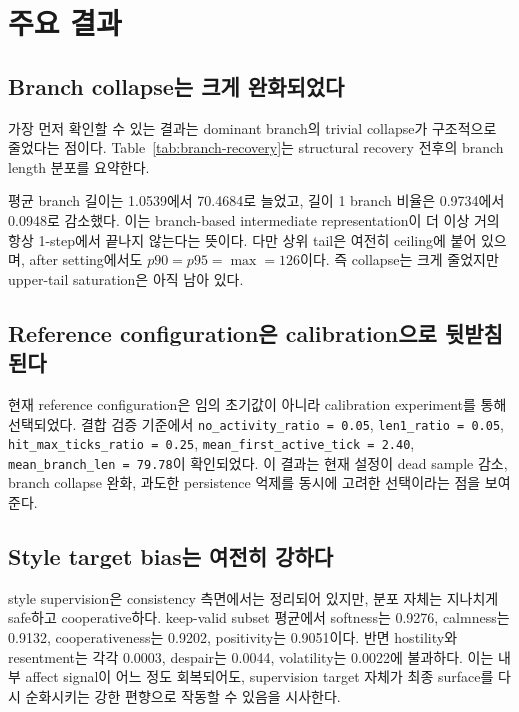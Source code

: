 \section{주요 결과}

\subsection{Branch collapse는 크게 완화되었다}

가장 먼저 확인할 수 있는 결과는 dominant branch의 trivial collapse가 구조적으로 줄었다는 점이다. Table~\ref{tab:branch-recovery}는 structural recovery 전후의 branch length 분포를 요약한다.



평균 branch 길이는 1.0539에서 70.4684로 늘었고, 길이 1 branch 비율은 0.9734에서 0.0948로 감소했다. 이는 branch-based intermediate representation이 더 이상 거의 항상 1-step에서 끝나지 않는다는 뜻이다. 다만 상위 tail은 여전히 ceiling에 붙어 있으며, after setting에서도 $p90 = p95 = \max = 126$이다. 즉 collapse는 크게 줄었지만 upper-tail saturation은 아직 남아 있다.

\subsection{Reference configuration은 calibration으로 뒷받침된다}

현재 reference configuration은 임의 초기값이 아니라 calibration experiment를 통해 선택되었다. 결합 검증 기준에서 \texttt{no\_activity\_ratio = 0.05}, \texttt{len1\_ratio = 0.05}, \texttt{hit\_max\_ticks\_ratio = 0.25}, \texttt{mean\_first\_active\_tick = 2.40}, \texttt{mean\_branch\_len = 79.78}이 확인되었다. 이 결과는 현재 설정이 dead sample 감소, branch collapse 완화, 과도한 persistence 억제를 동시에 고려한 선택이라는 점을 보여준다.

\subsection{Style target bias는 여전히 강하다}

style supervision은 consistency 측면에서는 정리되어 있지만, 분포 자체는 지나치게 safe하고 cooperative하다. keep-valid subset 평균에서 softness는 0.9276, calmness는 0.9132, cooperativeness는 0.9202, positivity는 0.9051이다. 반면 hostility와 resentment는 각각 0.0003, despair는 0.0044, volatility는 0.0022에 불과하다. 이는 내부 affect signal이 어느 정도 회복되어도, supervision target 자체가 최종 surface를 다시 순화시키는 강한 편향으로 작동할 수 있음을 시사한다.

